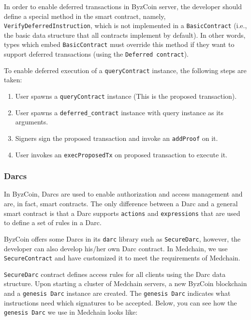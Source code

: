 In order to enable deferred transactions in ByzCoin server, the developer should define a special method in the smart contract, namely, \texttt{VerifyDeferredInstruction}, which is not implemented in a \texttt{BasicContract} (i.e., the basic data structure that all contracts implement by default). In other words, types which embed \texttt{BasicContract} must override this method if they want to support deferred transactions (using the \texttt{Deferred contract}). 

To enable deferred execution of a \texttt{queryContract} instance, the following steps are taken:
\begin{enumerate}
    \item User spawns a \texttt{queryContract} instance (This is the proposed transaction).
    \item User spawns a \texttt{deferred\_contract} instance with query instance as its arguments.
    \item Signers sign the proposed transaction and invoke an \texttt{addProof} on it.
    \item User invokes an \texttt{execProposedTx} on proposed transaction to execute it.
\end{enumerate}

\subsubsection{Darcs} \label{impl:darcs}
In ByzCoin, Darcs are used to enable authorization and access management and are, in fact, smart contracts. The only difference between a Darc and a general smart contract is that a Darc supports \texttt{actions} and \texttt{expressions} that are used to define a set of rules in a Darc.

ByzCoin offers some Darcs in its \texttt{darc} library such as \texttt{SecureDarc}, however, the developer can also develop his/her own Darc contract. In Medchain, we use \texttt{SecureContract} and have customized it to meet the requirements of Medchain. 

\texttt{SecureDarc} contract defines access rules for all clients using the Darc data structure. Upon starting a cluster of Medchain servers, a new ByzCoin blockchain and a \texttt{genesis Darc} instance are created. The \texttt{genesis Darc} indicates what instructions need which signatures to be accepted. Below, you can see how the \texttt{genesis Darc} we use in Medchain looks like:

